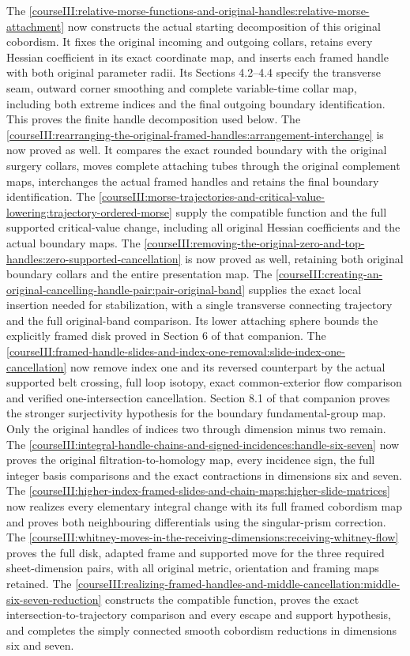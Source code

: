 The \cref{courseIII:relative-morse-functions-and-original-handles:relative-morse-attachment} now constructs the actual starting decomposition of this original cobordism. It fixes the original incoming and outgoing collars, retains every Hessian coefficient in its exact coordinate map, and inserts each framed handle with both original parameter radii. Its Sections 4.2--4.4 specify the transverse seam, outward corner smoothing and complete variable-time collar map, including both extreme indices and the final outgoing boundary identification. This proves the finite handle decomposition used below. The \cref{courseIII:rearranging-the-original-framed-handles:arrangement-interchange} is now proved as well. It compares the exact rounded boundary with the original surgery collars, moves complete attaching tubes through the original complement maps, interchanges the actual framed handles and retains the final boundary identification. The \cref{courseIII:morse-trajectories-and-critical-value-lowering:trajectory-ordered-morse} supply the compatible function and the full supported critical-value change, including all original Hessian coefficients and the actual boundary maps. The \cref{courseIII:removing-the-original-zero-and-top-handles:zero-supported-cancellation} is now proved as well, retaining both original boundary collars and the entire presentation map. The \cref{courseIII:creating-an-original-cancelling-handle-pair:pair-original-band} supplies the exact local insertion needed for stabilization, with a single transverse connecting trajectory and the full original-band comparison. Its lower attaching sphere bounds the explicitly framed disk proved in Section 6 of that companion. The \cref{courseIII:framed-handle-slides-and-index-one-removal:slide-index-one-cancellation} now remove index one and its reversed counterpart by the actual supported belt crossing, full loop isotopy, exact common-exterior flow comparison and verified one-intersection cancellation. Section 8.1 of that companion proves the stronger surjectivity hypothesis for the boundary fundamental-group map. Only the original handles of indices two through dimension minus two remain. The \cref{courseIII:integral-handle-chains-and-signed-incidences:handle-six-seven} now proves the original filtration-to-homology map, every incidence sign, the full integer basis comparisons and the exact contractions in dimensions six and seven. The \cref{courseIII:higher-index-framed-slides-and-chain-maps:higher-slide-matrices} now realizes every elementary integral change with its full framed cobordism map and proves both neighbouring differentials using the singular-prism correction. The \cref{courseIII:whitney-moves-in-the-receiving-dimensions:receiving-whitney-flow} proves the full disk, adapted frame and supported move for the three required sheet-dimension pairs, with all original metric, orientation and framing maps retained. The \cref{courseIII:realizing-framed-handles-and-middle-cancellation:middle-six-seven-reduction} constructs the compatible function, proves the exact intersection-to-trajectory comparison and every escape and support hypothesis, and completes the simply connected smooth cobordism reductions in dimensions six and seven.

